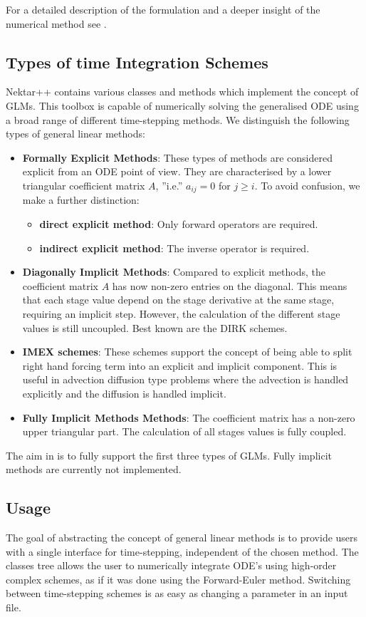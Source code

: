 For a detailed description of the formulation and a deeper insight of the
numerical method see \cite{Vostime}.


\subsection{Types of time Integration Schemes}
Nektar++ contains various classes and methods which implement the concept of
GLMs. This toolbox is capable of numerically solving the generalised ODE using a
broad range of different time-stepping methods. We distinguish the following
types of general linear methods:
\begin{itemize}
\item \textbf{Formally Explicit Methods}: These types of methods are
considered explicit from an ODE point of view. They are characterised by a lower
  triangular coefficient matrix $A$, ''i.e.'' $a_{ij} = 0$
  for $j\geq i$. To avoid confusion, we make a further distinction:
  \begin{itemize}
    \item \textbf{direct explicit method}: Only forward operators are required.
    \item \textbf{indirect explicit method}: The inverse operator is required.
  \end{itemize}
  \item \textbf{Diagonally Implicit Methods}: Compared to explicit methods,
  the coefficient matrix $A$ has now non-zero entries on the diagonal.
  This means that each stage value depend on the stage derivative at the same
  stage, requiring an implicit step. However, the calculation of the different
  stage values is still uncoupled. Best known are the DIRK schemes.
  \item \textbf{IMEX schemes}: These schemes support the concept of being able
  to split right hand forcing term into an explicit and implicit component. This is
  useful in advection diffusion type problems where the advection is handled
  explicitly and the diffusion is handled implicit.
  \item \textbf{Fully Implicit Methods Methods}: The coefficient matrix has a
  non-zero upper triangular part. The calculation of all stages values is fully coupled.
\end{itemize}

The aim in {\nek} is to fully support the first three types of GLMs.
Fully implicit methods are currently not implemented.

\subsection{Usage}
The goal of abstracting the concept of general linear methods is to provide
users with a single interface for time-stepping, independent of the chosen
method. The classes tree allows the user to numerically integrate ODE's using
high-order complex schemes, as if it was done using the Forward-Euler method.
Switching between time-stepping schemes is as easy as changing a parameter in an
input file.

